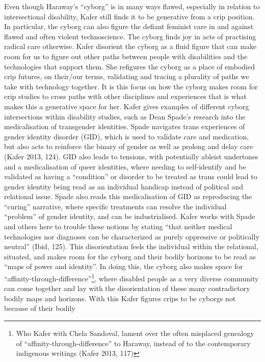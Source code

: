 Even though Haraway's ``cyborg'' is in many ways flawed, especially in
relation to intersectional disability, Kafer still finds it to be
generative from a crip position. In particular, the cyborg can also
figure the defiant feminist care in and against flawed and often violent
technoscience. The cyborg finds joy in acts of practising radical care
otherwise. Kafer disorient the cyborg as a fluid figure that can make
room for us to figure out other paths between people with disabilities
and the technologies that support them. She refigures the cyborg as a
place of embodied crip futures, on their/our terms, validating and
tracing a plurality of paths we take with technology together. It is
this focus on how the cyborg makes room for crip studies to cross paths
with other disciplines and experiences that is what makes this a
generative space for her. Kafer gives examples of different cyborg
intersections within disability studies, such as Dean Spade's research
into the medicalisation of transgender identities. Spade navigates trans
experiences of gender identity disorder (GID), which is used to validate
care and medication, but also acts to reinforce the binary of gender as
well as prolong and delay care (Kafer 2013, 124). GID also leads to
tensions, with potentially ableist undertones and a medicalisation of
queer identities, where needing to self-identify and be validated as
having a ``condition'' or disorder to be treated as trans could lead to
gender identity being read as an individual handicap instead of
political and relational issue. Spade also reads this medicalisation of
GID as reproducing the ``curing'' narrative, where specific treatments
can resolve the individual ``problem'' of gender identity, and can be
industrialised. Kafer works with Spade and others here to trouble these
notions by stating ``that neither medical technologies nor diagnoses can
be characterized as purely oppressive or politically neutral'' (Ibid,
125). This disorientation feels the individual within the relational,
situated, and makes room for the cyborg and their bodily horizons to be
read as ``maps of power and identity''. In doing this, the cyborg also
makes space for ``affinity-through-difference''\footnote{Who Kafer with
  Chela Sandoval, lament over the often misplaced genealogy of
  ``affinity-through-difference'' to Haraway, instead of to the
  contemporary indigenous writings (Kafer 2013, 117)}, where disabled
people as a very diverse community can come together and lay with the
disorientation of these many contradictory bodily maps and horizons.
With this Kafer figures crips to be cyborgs not because of their bodily
